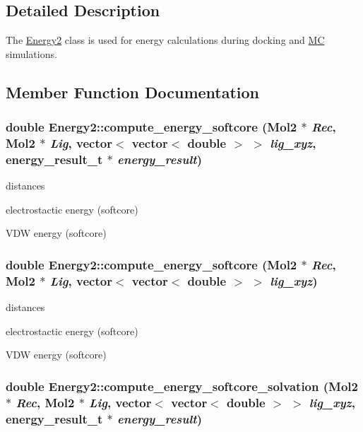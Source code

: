 \subsection{Detailed Description}
The \hyperlink{classEnergy2}{Energy2} class is used for energy calculations during docking and \hyperlink{classMC}{MC} simulations. 

\subsection{Member Function Documentation}
\hypertarget{classEnergy2_ade85175ed28a01f9e065683e7bb20a29}{
\subsubsection[{compute\_\-energy\_\-softcore}]{\setlength{\rightskip}{0pt plus 5cm}double Energy2::compute\_\-energy\_\-softcore ({\bf Mol2} $\ast$ {\em Rec}, \/  {\bf Mol2} $\ast$ {\em Lig}, \/  vector$<$ vector$<$ double $>$ $>$ {\em lig\_\-xyz}, \/  {\bf energy\_\-result\_\-t} $\ast$ {\em energy\_\-result})}}
\label{classEnergy2_ade85175ed28a01f9e065683e7bb20a29}


distances

electrostactic energy (softcore)

VDW energy (softcore) \hypertarget{classEnergy2_aaac598707f6a3fab0df8d7436b3cdeeb}{
\subsubsection[{compute\_\-energy\_\-softcore}]{\setlength{\rightskip}{0pt plus 5cm}double Energy2::compute\_\-energy\_\-softcore ({\bf Mol2} $\ast$ {\em Rec}, \/  {\bf Mol2} $\ast$ {\em Lig}, \/  vector$<$ vector$<$ double $>$ $>$ {\em lig\_\-xyz})}}
\label{classEnergy2_aaac598707f6a3fab0df8d7436b3cdeeb}


distances

electrostactic energy (softcore)

VDW energy (softcore) \hypertarget{classEnergy2_aeaab8d7882978f706c549575abbfb571}{
\subsubsection[{compute\_\-energy\_\-softcore\_\-solvation}]{\setlength{\rightskip}{0pt plus 5cm}double Energy2::compute\_\-energy\_\-softcore\_\-solvation ({\bf Mol2} $\ast$ {\em Rec}, \/  {\bf Mol2} $\ast$ {\em Lig}, \/  vector$<$ vector$<$ double $>$ $>$ {\em lig\_\-xyz}, \/  {\bf energy\_\-result\_\-t} $\ast$ {\em energy\_\-result})}}
\label{classEnergy2_aeaab8d7882978f706c549575abbfb571}


